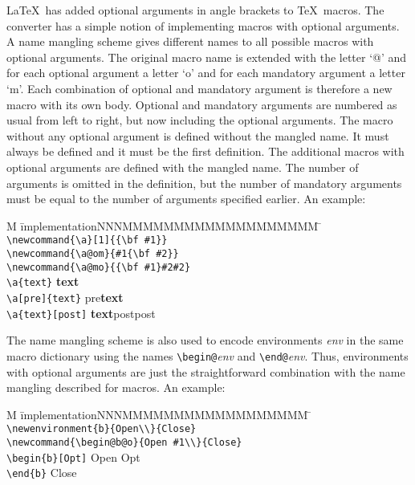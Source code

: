 \documentclass[11pt]{article}
\begin{document}
\LaTeX\ has added optional arguments in angle brackets to \TeX\ 
macros. The converter has a simple notion of implementing macros with
optional arguments. A name mangling scheme gives different names to
all possible macros with optional arguments. The original macro name
is extended with the letter `@' and for each optional argument a
letter `o' and for each mandatory argument a letter `m'. Each
combination of optional and mandatory argument is therefore a new
macro with its own body. Optional and mandatory arguments are numbered
as usual from left to right, but now including the optional arguments.
The macro without any optional argument is defined without the mangled
name. It must always be defined and it must be the first definition.
The additional macros with optional arguments are defined with the
mangled name. The number of arguments is omitted in the definition,
but the number of mandatory arguments must be equal to the number of
arguments specified earlier. An example:
\index{arguments, macro}

\begin{tabbing}
  M \= implementationNNNMMMMMMMMMMMMMMMMMMM \= \kill
  \> \verb+\newcommand{\a}[1]{{\bf #1}}+ \\
  \> \verb+\newcommand{\a@om}{#1{\bf #2}}+ \\
  \> \verb+\newcommand{\a@mo}{{\bf #1}#2#2}+ \\
  \> \verb+\a{text}+         \> {\bf text}\\
  \> \verb+\a[pre]{text}+    \> pre{\bf text}\\
  \> \verb+\a{text}[post]+   \> {\bf text}postpost
\end{tabbing}

The name mangling scheme is also used to encode environments {\em
  env\/} in the same macro dictionary using the names
\verb+\begin@+{\em env\/} and \verb+\end@+{\em env}. Thus,
environments with optional arguments are just the straightforward
combination with the name mangling described for macros. An example:

\begin{tabbing}
  M \= implementationNNNMMMMMMMMMMMMMMMMMM \= \kill
  \> \verb+\newenvironment{b}{Open\\}{Close}+ \\
  \> \verb+\newcommand{\begin@b@o}{Open #1\\}{Close}+ \\
  \> \verb+\begin{b}[Opt]+        \> Open Opt\\
  \> \verb+\end{b}+               \> Close
\end{tabbing}
\end{document}
